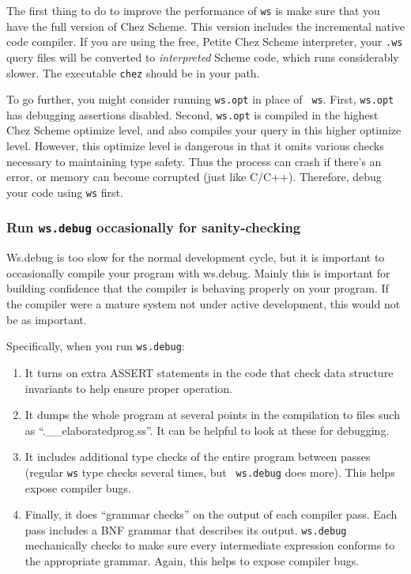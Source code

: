 \documentclass[twocolumn]{report}
\begin{document}
The first thing to do to improve the performance of {\tt ws} is make
sure that you have the full version of Chez Scheme.  This version
includes the incremental native code compiler.  If you are using the
free, Petite Chez Scheme interpreter, your {\tt .ws} query files will
be converted to {\em interpreted} Scheme code, which runs considerably
slower.  The executable {\tt chez} should be in your path.

To go further, you might consider running {\tt ws.opt} in place of {\tt
ws}.  First, {\tt ws.opt} has debugging assertions disabled. 
Second, {\tt ws.opt} is compiled in the highest Chez Scheme optimize
level, and also compiles your query in this higher optimize level.
However, this optimize level is dangerous in that it omits various
checks necessary to maintaining type safety.  Thus the process can
crash if there's an error, or memory can become corrupted (just like
C/C++).  Therefore, debug your code using {\tt ws} first.

\subsubsection*{Run {\tt \bf ws.debug} occasionally for sanity-checking}

Ws.debug is too slow for the normal development cycle, but it is
important to occasionally compile your program with ws.debug.  Mainly
this is important for building confidence that the compiler is
behaving properly on your program.  If the
compiler were a mature system not under active development, this would
not be as important.  


Specifically, when you run {\tt ws.debug}:

\begin{enumerate}
\item It turns on extra ASSERT statements in the code that check data
structure invariants to help ensure proper operation.

\item It dumps the whole program at several points in the
  compilation to files such as ``.\_\_elaboratedprog.ss''.  It can be
  helpful to look at these for debugging.

\item It includes additional type checks of the entire program between
  passes (regular {\tt ws} type checks several times, but {\tt
  ws.debug} does more).  This helps expose compiler bugs.

\item Finally, it does ``grammar checks'' on the output of each compiler
  pass. Each pass includes a BNF grammar that describes its output.
  {\tt ws.debug} mechanically checks to make sure every intermediate
  expression conforms to the appropriate grammar.  Again, this helps
  to expose compiler bugs.
\end{enumerate}
\end{document}
